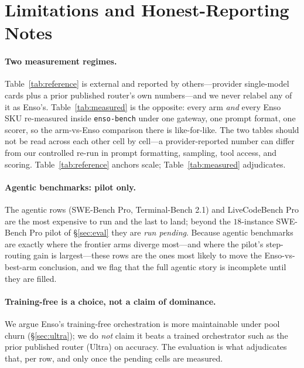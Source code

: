 \documentclass[11pt]{article}
\begin{document}
\section{Limitations and Honest-Reporting Notes}
\label{sec:limits}

\paragraph{Two measurement regimes.} Table~\ref{tab:reference} is external and
reported by others---provider single-model cards plus a prior published router's
own numbers---and we never relabel any of it as Enso's. Table~\ref{tab:measured} is
the opposite: every arm \emph{and} every Enso SKU re-measured inside
\texttt{enso-bench} under one gateway, one prompt format, one scorer, so the
arm-vs-Enso comparison there is like-for-like. The two tables should not be read
across each other cell by cell---a provider-reported number can differ from our
controlled re-run in prompt formatting, sampling, tool access, and scoring.
Table~\ref{tab:reference} anchors scale; Table~\ref{tab:measured} adjudicates.

\paragraph{Agentic benchmarks: pilot only.} The agentic rows (SWE-Bench Pro,
Terminal-Bench 2.1) and LiveCodeBench Pro are the most expensive to run and the
last to land; beyond the $18$-instance SWE-Bench Pro pilot of \S\ref{sec:eval} they
are \emph{run pending}. Because agentic benchmarks are exactly where the frontier
arms diverge most---and where the pilot's step-routing gain is largest---these rows
are the ones most likely to move the Enso-vs-best-arm conclusion, and we flag that
the full agentic story is incomplete until they are filled.

\paragraph{Training-free is a choice, not a claim of dominance.} We argue Enso's
training-free orchestration is more maintainable under pool churn
(\S\ref{sec:ultra}); we do \emph{not} claim it beats a trained orchestrator such as
the prior published router (Ultra) on accuracy. The evaluation is what adjudicates
that, per row, and only once the pending cells are measured.
\end{document}

